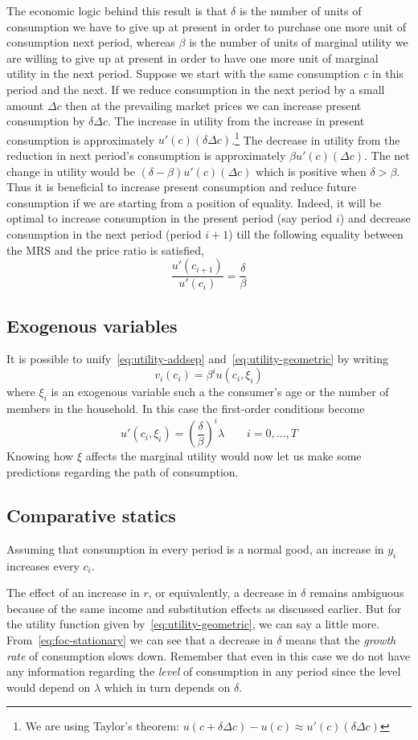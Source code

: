 \documentclass[12pt,reqno]{amsart}
\begin{document}
The economic logic behind this result is that $\delta$ is the number of
units of consumption we have to give up at present in order to
purchase one more unit of consumption next period, whereas $\beta$ is
the number of units of marginal utility we are willing to give up at
present in order to have one more unit of marginal utility in the next
period. Suppose we start with the same consumption $c$ in this period and
the next. If we reduce consumption in the next period by a small
amount $\Delta c$ then at the prevailing market prices we can
increase present consumption by $\delta\Delta c$. The increase in
utility from the increase in present consumption is approximately
$u'(c)(\delta\Delta c)$.\footnote{We are using Taylor's theorem:
  $u(c+\delta\Delta c)-u(c) \approx u'(c)(\delta\Delta c)$} The decrease in utility from the reduction in
next period's consumption is approximately $\beta u'(c)(\Delta c)$. The
net change in utility would be $(\delta-\beta)u'(c)(\Delta c)$ which
is positive when $\delta>\beta$. Thus it is beneficial to increase present consumption and
reduce future consumption if we are starting from a position of
equality. Indeed, it will be optimal to increase consumption in the
present period (say period $i$) and decrease consumption in the next
period (period $i+1$) till the following equality between the MRS and
the price ratio is satisfied,
\[\frac{u'(c_{i+1})}{u'(c_i)}=\frac{\delta}{\beta}\]
\subsection{Exogenous variables}
It is possible to unify~\eqref{eq:utility-addsep}
and~\eqref{eq:utility-geometric} by writing
\[v_i(c_i)=\beta^i u(c_i,\xi_i)\]
where $\xi_i$ is an exogenous variable such a the consumer's age or
the number of members in the household. In this case the first-order
conditions become
\[u'(c_i,\xi_i)=\left(\frac{\delta}{\beta}\right)^i \lambda \qquad
i=0,\ldots,T\]
Knowing how $\xi$ affects the marginal utility would
now let us make some predictions regarding the path of consumption.

\subsection{Comparative statics}
Assuming that consumption in every period is a normal good, an
increase in $y_i$ increases every $c_i$.

The effect of an increase in $r$, or equivalently, a decrease in
$\delta$ remains ambiguous because of the same income and substitution
effects as discussed earlier. But for the utility function given
by~\eqref{eq:utility-geometric}, we can say a little
more. From~\eqref{eq:foc-stationary} we can see that a decrease in
$\delta$ means that the \emph{growth rate} of consumption slows
down. Remember that even in this case we do not have any information
regarding the \emph{level} of consumption in any period since the
level would depend on $\lambda$ which in turn depends on $\delta$.
\end{document}
